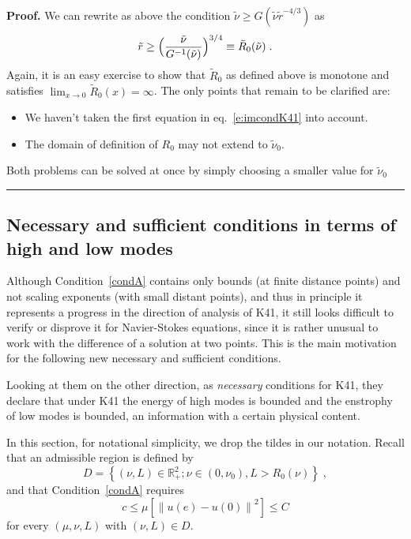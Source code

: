 \documentclass[11pt]{preprint}
\newenvironment{proof}[1][Proof]{\textbf{#1.} }{\ \rule{0.5em}{0.5em}}
\begin{document}
\begin{proof}
We can rewrite as above the condition $\tilde{\nu}\geq G(\tilde{\nu}\tilde
{r}^{-4/3})$ as
\begin{equation}
\tilde{r}\geq\Bigl({\frac{\tilde{\nu}}{G^{-1}(\tilde{\nu})}}\Bigr)^{3/4}%
\equiv\tilde{R}_{0}(\tilde{\nu})\;.
\end{equation}
Again, it is an easy exercise to show that $\tilde{R}_{0}$ as defined above is
monotone and satisfies $\lim_{x\rightarrow0}\tilde{R}_{0}(x)=\infty$. The only
points that remain to be clarified are:
\begin{itemize}
\item[a.]We haven't taken the first equation in eq.~\ref{e:imcondK41} into account.
\item[b.] The domain of definition of $R_{0}$ may not extend to $\tilde{\nu
}_{0}$.
\end{itemize}
Both problems can be solved at once by simply choosing a smaller value for
$\tilde{\nu}_{0}$
\end{proof}

%

\subsection{Necessary and sufficient conditions in terms of high and low modes}

Although Condition~\ref{condA} contains only bounds (at finite distance points) and not
scaling exponents (with small distant points), and thus in principle it
represents a progress in the direction of analysis of K41, it still looks
difficult to verify or disprove it for Navier-Stokes equations, since it is
rather unusual to work with the difference of a solution at two points. This
is the main motivation for the following new necessary and sufficient conditions.

Looking at them on the other direction, as \textit{necessary} conditions for
K41, they declare that under K41 the energy of high modes is bounded and the
enstrophy of low modes is bounded, an information with a certain physical content.

In this section, for notational simplicity, we drop the tildes in our notation. 
Recall that an admissible region is defined by
\[
D=\left\{  \left(  \nu,L\right)  \in\mathbb{R}_{+}^{2};\nu\in\left(  0,\nu
_{0}\right)  ,L>R_{0}\left(  \nu\right)  \right\}  \;,
\]
and that Condition~\ref{condA} requires
\[
c\leq\mu\left[  \left\|  u\left(  e\right)  -u(0)\right\|  ^{2}\right]  \leq C
\]
for every $(\mu,\nu,L)$ with $\left(  \nu,L\right)  \in D$. 
\end{document}
